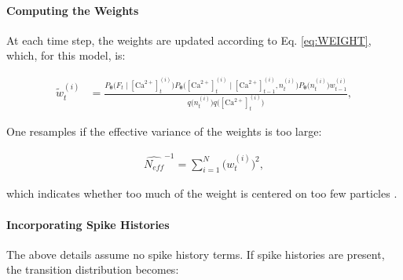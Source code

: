 \documentclass[12pt]{article}
\providecommand{\ve}[1]{\boldsymbol{#1}}
\providecommand{\ve}[1]{\boldsymbol{#1}}
\newcommand{\thetn}{\ve{\theta}}
\newcommand{\p}{P_{\thetn}}
\newcommand{\Ca}{[\text{Ca}^{2+}]}
\begin{document}
\paragraph{Computing the Weights}

At each time step, the weights are updated according to Eq. \ref{eq:WEIGHT}, which, for this model, is:

\begin{align} \label{aeq:cond_w}
\widetilde{w}_t^{(i)} &= \frac{\p\big(F_t \mid \Ca_t^{(i)}\big)
\p\big(\Ca_t^{(i)} \mid \Ca_{t-1}^{(i)}, n_t^{(i)}\big) \p\big(n_t^{(i)}\big) w_{t-1}^{(i)}}{q\big(n_t^{(i)}\big) q\big(\Ca_t^{(i)}\big)},
\end{align}

%
%
One resamples if the effective variance of the weights is too large: 

\begin{align} \label{eq:N_eff}
\widehat{N_{eff}}^{-1} = \sum_{i=1}^N \big(w_t^{(i)}\big)^2,
\end{align}

\noindent which indicates whether too much of the weight is centered on too few particles \cite{DoucetGordon01}.%

\paragraph{Incorporating Spike Histories}

The above details assume no spike history terms.  If spike histories are present, the transition distribution becomes:
\end{document}
